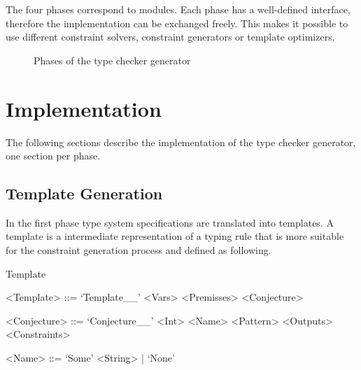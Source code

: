 The four phases correspond to modules. Each phase has a well-defined
interface, therefore the implementation can be exchanged freely. This
makes it possible to use different constraint solvers, constraint
generators or template optimizers.

\begin{figure}
\caption{Phases of the type checker generator}
\label{fig:phases}
\end{figure}
\section{Implementation}
\label{sec:implementation}
The following sections describe the implementation of the type checker
generator, one section per phase.

\subsection{Template Generation}
\label{sec:constraint-templates}
In the first phase type system specifications are translated into
templates. A template is a intermediate representation of a typing
rule that is more suitable for the constraint generation process and
defined as following.

\begin{definition}{Template}
  \begin{grammar}
    <Template> ::= `Template__' <Vars> <Premisses> <Conjecture>

    <Conjecture> ::= `Conjecture__' <Int> <Name> <Pattern> <Outputs> <Constraints>

    <Name> ::= `Some' <String> | `None'
  \end{grammar}
\end{definition}

